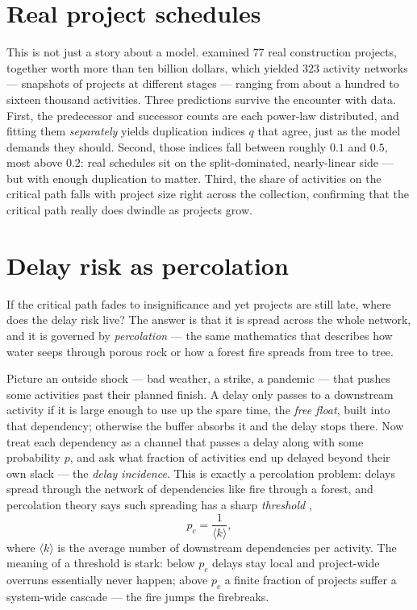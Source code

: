 \section{Real project schedules}

This is not just a story about a model. \citet{vazquezprojects2023} examined
$77$ real construction projects, together worth more than ten billion dollars,
which yielded $323$ activity networks --- snapshots of projects at different
stages --- ranging from about a hundred to sixteen thousand activities. Three
predictions survive the encounter with data. First, the predecessor and successor
counts are each power-law distributed, and fitting them \emph{separately} yields
duplication indices $q$ that agree, just as the model demands they should.
Second, those indices fall between roughly $0.1$ and $0.5$, most above $0.2$:
real schedules sit on the split-dominated, nearly-linear side --- but with enough
duplication to matter. Third, the share of activities on the critical path falls
with project size right across the collection, confirming that the critical path
really does dwindle as projects grow.

\section{Delay risk as percolation}

If the critical path fades to insignificance and yet projects are still late,
where does the delay risk live? The answer is that it is spread across the whole
network, and it is governed by \emph{percolation} --- the same mathematics that
describes how water seeps through porous rock or how a forest fire spreads from
tree to tree.

Picture an outside shock --- bad weather, a strike, a pandemic --- that pushes
some activities past their planned finish. A delay only passes to a downstream
activity if it is large enough to use up the spare time, the \emph{free float},
built into that dependency; otherwise the buffer absorbs it and the delay stops
there. Now treat each dependency as a channel that passes a delay along with some
probability $p$, and ask what fraction of activities end up delayed beyond their
own slack --- the \emph{delay incidence}. This is exactly a percolation problem:
delays spread through the network of dependencies like fire through a forest, and
percolation theory says such spreading has a sharp \emph{threshold}
\citep{albert2000,ellinas2019,schwartz2002},
\begin{equation}
  p_c = \frac{1}{\langle k\rangle},
  \label{eq:proj-pc}
\end{equation}
where $\langle k\rangle$ is the average number of downstream dependencies per
activity. The meaning of a threshold is stark: below $p_c$ delays stay local and
project-wide overruns essentially never happen; above $p_c$ a finite fraction of
projects suffer a system-wide cascade --- the fire jumps the firebreaks.

